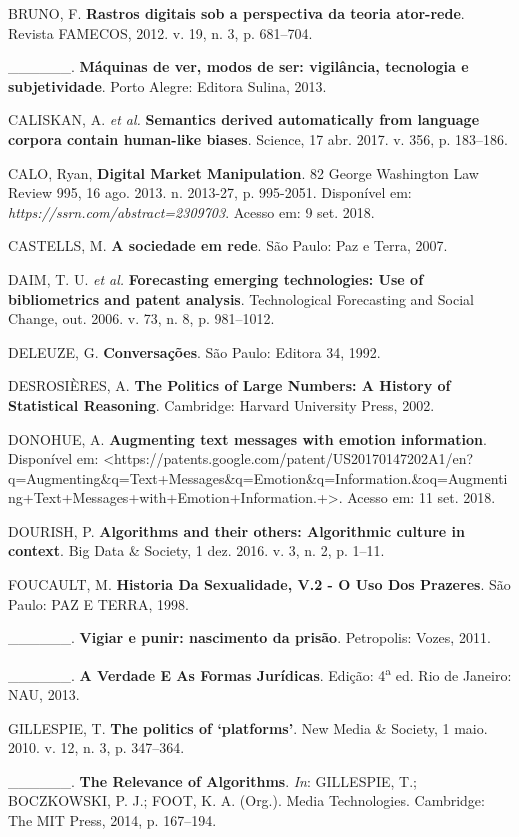 BRUNO, F. \textbf{Rastros digitais sob a perspectiva da teoria
ator-rede}. Revista FAMECOS, 2012. v. 19, n. 3, p. 681--704.

\_\_\_\_\_\_. \textbf{Máquinas de ver, modos de ser: vigilância,
tecnologia e subjetividade}. Porto Alegre: Editora Sulina, 2013.

CALISKAN, A. \emph{et al.} \textbf{Semantics derived automatically from
language corpora contain human-like biases}. Science, 17 abr. 2017. v.
356, p. 183--186.

CALO, Ryan, \textbf{Digital Market Manipulation}. 82 George Washington
Law Review 995, 16 ago. 2013. n. 2013-27, p. 995-2051. Disponível em:
\emph{https://ssrn.com/abstract=2309703}. Acesso em: 9 set. 2018.

CASTELLS, M. \textbf{A sociedade em rede}. São Paulo: Paz e Terra, 2007.

DAIM, T. U. \emph{et al.} \textbf{Forecasting emerging technologies: Use
of bibliometrics and patent analysis}. Technological Forecasting and
Social Change, out. 2006. v. 73, n. 8, p. 981--1012.

DELEUZE, G. \textbf{Conversações}. São Paulo: Editora 34, 1992.

DESROSIÈRES, A. \textbf{The Politics of Large Numbers: A History of
Statistical Reasoning}. Cambridge: Harvard University Press, 2002.

DONOHUE, A. \textbf{Augmenting text messages with emotion information}.
Disponível em:
\textless{}https://patents.google.com/patent/US20170147202A1/en?q=Augmenting\&q=Text+Messages\&q=Emotion\&q=Information.\&oq=Augmenting+Text+Messages+with+Emotion+Information.+\textgreater{}.
Acesso em: 11 set. 2018.

DOURISH, P. \textbf{Algorithms and their others: Algorithmic culture in
context}. Big Data \& Society, 1 dez. 2016. v. 3, n. 2, p. 1--11.

FOUCAULT, M. \textbf{Historia Da Sexualidade, V.2 - O Uso Dos Prazeres}.
São Paulo: PAZ E TERRA, 1998.

\_\_\_\_\_\_. \textbf{Vigiar e punir: nascimento da prisão}. Petropolis:
Vozes, 2011.

\_\_\_\_\_\_. \textbf{A Verdade E As Formas Jurídicas}. Edição:
4\textsuperscript{a} ed. Rio de Janeiro: NAU, 2013.

GILLESPIE, T. \textbf{The politics of `platforms'}. New Media \&
Society, 1 maio. 2010. v. 12, n. 3, p. 347--364.

\_\_\_\_\_\_. \textbf{The Relevance of Algorithms}. \emph{In}:
GILLESPIE, T.; BOCZKOWSKI, P. J.; FOOT, K. A. (Org.). Media
Technologies. Cambridge: The MIT Press, 2014, p. 167--194.


